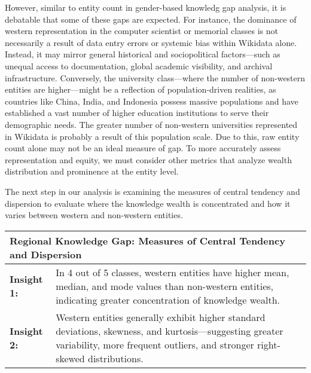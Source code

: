 However, similar to entity count in gender-based knowledg gap analysis, it is debatable that some of these gaps are expected. For instance, the dominance of western representation in the computer scientist or memorial classes is not necessarily a result of data entry errors or systemic bias within Wikidata alone. Instead, it may mirror general historical and sociopolitical factors—such as unequal access to documentation, global academic visibility, and archival infrastructure. Conversely, the university class—where the number of non-western entities are higher—might be a reflection of population-driven realities, as countries like China, India, and Indonesia possess massive populations and have established a vast number of higher education institutions to serve their demographic needs. The greater number of non-western universities represented in Wikidata is probably a result of this population scale. Due to this, raw entity count alone may not be an ideal measure of gap. To more accurately assess representation and equity, we must consider other metrics that analyze wealth distribution and prominence at the entity level.


The next step in our analysis is examining the measures of central tendency and dispersion to evaluate where the knowledge wealth is concentrated and how it varies between western and non-western entities.

\begin{table}[h]
    \centering
    \renewcommand{\arraystretch}{1.3}
    \begin{tabular}{|l p{12cm}|} 
        \hline
        \multicolumn{2}{|l|}{\textbf{Regional Knowledge Gap: Measures of Central Tendency and Dispersion}} \\
        \hline
        \textbf{Insight 1:} & In 4 out of 5 classes, western entities have higher mean, median, and mode values than non-western entities, indicating greater concentration of knowledge wealth. \\
        \textbf{Insight 2:} & Western entities generally exhibit higher standard deviations, skewness, and kurtosis—suggesting greater variability, more frequent outliers, and stronger right-skewed distributions. \\
        \hline
    \end{tabular}
\end{table}

